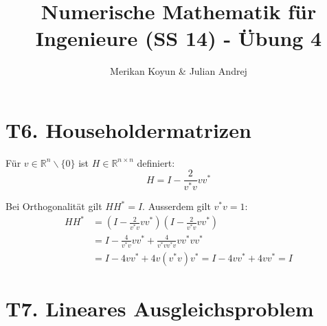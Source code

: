 \documentclass[11pt]{article}
\theoremstyle{plain}
\theoremstyle{definition}
\renewcommand{\a}{\"{a}}
\renewcommand{\u}{\"{u}}
\begin{document}
\title{Numerische Mathematik f\u r Ingenieure (SS 14) - \"{U}bung 4}
\author{Merikan Koyun \& Julian Andrej}
\maketitle

\section*{T6. Householdermatrizen}
F\u r $v \in \mathbb{R}^n \backslash \{0\}$ ist $H \in \mathbb{R}^{n\times n}$ definiert:
\begin{equation}
H = I - \frac{2}{v^*v} vv^*
\end{equation}

Bei Orthogonalit\a t gilt $HH^*=I$. Ausserdem gilt $v^*v=1$:
\begin{align}
HH^* &= (I-\frac{2}{v^*v}vv^*)(I-\frac{2}{v^*v}vv^*) \\
&=  I - \frac{4}{v^*v}vv^* + \frac{4}{v^*v v^*v} vv^*vv^* \\
&= I - 4vv^* + 4v(v^*v)v^* = I-4vv^* + 4vv^* = I
\end{align}








\section*{T7. Lineares Ausgleichsproblem}
\end{document}
